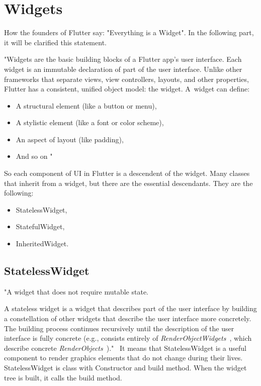 \section{Widgets}\label{sec:widgets}
How the founders of Flutter say: "Everything is a Widget".
In the following part, it will be clarified this statement.

"Widgets are the basic building blocks of a Flutter app's user interface.
Each widget is an immutable declaration of part of the user interface.
Unlike other frameworks that separate views, view controllers, layouts, and other properties, Flutter has a consistent, unified object model: the widget.
A~widget can define:
\begin{itemize}
    \item A structural element (like a button or menu),
    \item A stylistic element (like a font or color scheme),
    \item An aspect of layout (like padding),
    \item And so on \textellipsis"~\cite{flutterTechnicalOverview}
\end{itemize}
So each component of UI in Flutter is a descendent of the widget.
Many classes that inherit from a widget, but there are the essential descendants.
They are the following:
\begin{itemize}
    \item StatelessWidget,
    \item StatefulWidget,
    \item InheritedWidget.
\end{itemize}


\subsection{StatelessWidget}\label{subsec:statelesswidget}
"A widget that does not require mutable state.

A stateless widget is a widget that describes part of the user interface by building a constellation of other widgets that describe the user interface more concretely.
The building process continues recursively until the description of the user interface is fully concrete (e.g., consists entirely of
\textit{RenderObjectWidgets}~\cite{renderObjectWidget}, which describe concrete \textit{RenderObjects}~\cite{renderObject})."~\cite{statelessWidget}
It means that StatelessWidget is a useful component to render graphics elements that do not change during their lives.
StatelessWidget is class with Constructor and build method.
When the widget tree is built, it calls the build method.

